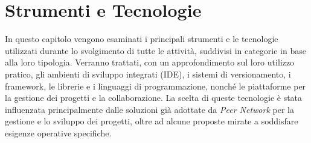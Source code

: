 \chapter{Strumenti e Tecnologie}
In questo capitolo vengono esaminati i principali strumenti e le tecnologie utilizzati durante lo svolgimento di tutte le attività, suddivisi in categorie
in base alla loro tipologia. Verranno trattati, con un approfondimento sul loro utilizzo pratico, gli ambienti di sviluppo integrati (IDE), i sistemi di
versionamento, i framework, le librerie e i linguaggi di programmazione, nonché le piattaforme per la gestione dei progetti e la collaborazione.
La scelta di queste tecnologie è stata influenzata principalmente dalle soluzioni già adottate da \textit{Peer Network} per la gestione e lo sviluppo dei progetti, 
oltre ad alcune proposte mirate a soddisfare esigenze operative specifiche.

